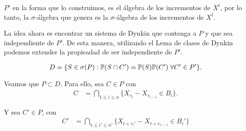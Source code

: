 $P'$ en la forma que lo construimos, es el álgebra de los incrementos de $X^t$, por lo tanto, 
la $\sigma$-álgebra que genera es la $\sigma$-álgebra de los incrementos de $X^t$.\pn

La idea ahora es encontrar un sistema de Dynkin que contenga a $P$ y que sea independiente
de $P'$. De esta manera, utilizando el Lema de clases de Dynkin podemos extender la propieadad de ser
independiente de $P'$.\pn

\begin{align}
    D =   \{ S \in \sigma(P) : \P(S  \cap C') = \P(S) \P(C') \; \forall C' \in P'\}.
\end{align}\pn

Veamos que $P \subset D$. Para ello, sea $C \in P$ con
\begin{align}
     C  &=  \bigcap_{1 \leq i\leq n} \{ X_{s_i} - X_{s_{i-1}} \in B_i \}.
\end{align}\pn

Y sea $C' \in P$, con
\begin{align}
    C'  &=  \bigcap_{1 \leq i' \leq n'} \{  X_{t + r_i'} - X_{t + r_{i' - 1}} \in B_i' \}
\end{align}

